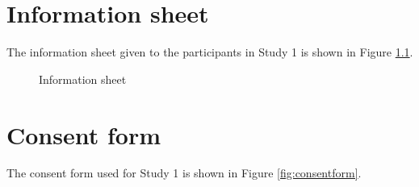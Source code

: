 
\chapter{Information sheet}\label{ch:information_sheet}
The information sheet given to the participants in Study 1 is shown in Figure \ref{fig:informationsheet}. 

\begin{figure}[htp] 
\caption{Information sheet}
\label{fig:informationsheet}
\end{figure} 

\chapter{Consent form}\label{ch:consentform}
The consent form used for Study 1 is shown in Figure \ref{fig:consentform}. 

